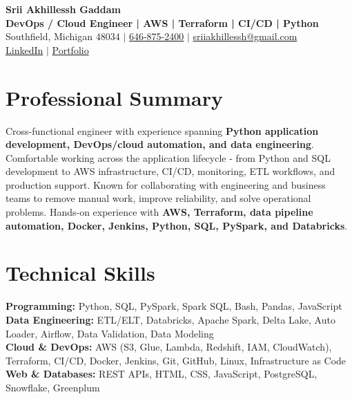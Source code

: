 \documentclass[letterpaper,10pt]{article}
\begin{document}
\fontsize{9.35pt}{10.45pt}\selectfont

\begin{center}
    {\LARGE \textbf{Srii Akhillessh Gaddam}} \\[-1pt]
    \textbf{DevOps / Cloud Engineer | AWS | Terraform | CI/CD | Python} \\[2pt]
    Southfield, Michigan 48034 $|$
    \href{tel:6468752400}{646-875-2400} $|$
    \href{mailto:sriiakhillessh@gmail.com}{sriiakhillessh@gmail.com} \\[1pt]
    \href{https://www.linkedin.com/in/srii-akhiilessh-gaddam-b48668191/}{LinkedIn} $|$
    \href{https://sriiakhillesshg.github.io/portfolio/}{Portfolio}
\end{center}
\vspace{-8pt}

\section{Professional Summary}
\small{Cross-functional engineer with experience spanning \textbf{Python application development, DevOps/cloud automation, and data engineering}. Comfortable working across the application lifecycle - from Python and SQL development to AWS infrastructure, CI/CD, monitoring, ETL workflows, and production support. Known for collaborating with engineering and business teams to remove manual work, improve reliability, and solve operational problems. Hands-on experience with \textbf{AWS, Terraform, data pipeline automation, Docker, Jenkins, Python, SQL, PySpark, and Databricks}.}

\section{Technical Skills}
\small{
\textbf{Programming:} Python, SQL, PySpark, Spark SQL, Bash, Pandas, JavaScript \\
\textbf{Data Engineering:} ETL/ELT, Databricks, Apache Spark, Delta Lake, Auto Loader, Airflow, Data Validation, Data Modeling \\
\textbf{Cloud \& DevOps:} AWS (S3, Glue, Lambda, Redshift, IAM, CloudWatch), Terraform, CI/CD, Docker, Jenkins, Git, GitHub, Linux, Infrastructure as Code \\
\textbf{Web \& Databases:} REST APIs, HTML, CSS, JavaScript, PostgreSQL, Snowflake, Greenplum
}
\end{document}
